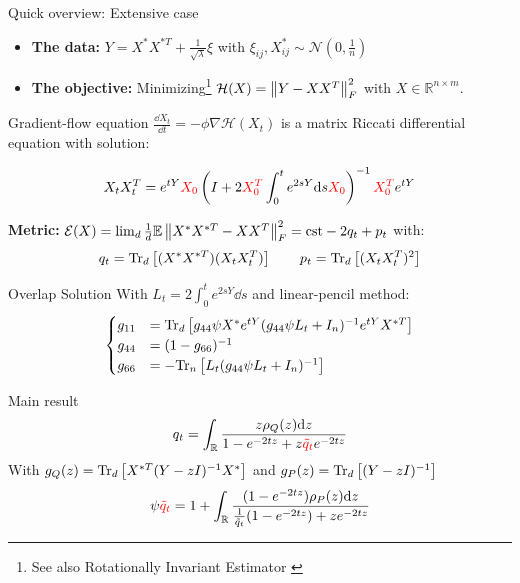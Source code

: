 \documentclass[10pt]{beamer}
\begin{document}
\begin{frame}{Quick overview: Extensive case}
  \begin{itemize}
    \item \textbf{The data:} $ Y = X^* X^{*T} + \frac{1}{\sqrt \lambda} \xi$ with $\xi_{ij},X_{ij}^*  \sim \mathcal N(0,\frac{1}{n})$ 
    \item \textbf{The objective:} Minimizing\footnote{See also Rotationally Invariant Estimator \cite{potters2020first}}
    $\mathcal H(X) = \norm{Y-XX^T}^2_F$ with $X \in \mathbb R^{n \times m}$.
  \end{itemize}

  Gradient-flow equation $\frac{\dd X_t}{\dd t} = - \phi \nabla \mathcal H(X_t)$ is a matrix Riccati differential equation with solution:

    \begin{equation*}
      X_t X_t^T = e^{tY} \textcolor{red}{X_0} \left( 
        I + 2 \textcolor{red}{X_0^T} \int_0^t e^{2sY} \dd s \textcolor{red}{X_0}
        \right)^{-1} \textcolor{red}{X_0^T} e^{tY}
    \end{equation*}

    \textbf{Metric:} $\mathcal E(X) = \lim_{d} \frac{1}{d} \mean \norm{X^* X^{*T} - XX^T}_F^2 = \text{cst} - 2 q_t + p_t$ with:
    \begin{equation*}
      q_t = \traceLim[d]{(X^*X^{*T}) (X_t X_t^T)}
      \qquad
      p_t = \traceLim[d]{(X_t X_t^T)^2}
    \end{equation*}

\end{frame}

\begin{frame}{Overlap Solution}
  With $L_t = 2\int_0^t e^{2sY}\dd s$ and linear-pencil method:
  \begin{equation*}
    \begin{cases}
      g_{11} &= \traceLim[d]{ g_{44} \psi X^* e^{tY} ( g_{44} \psi L_t + I_n)^{-1} e^{tY} X^{*T} } \\
      g_{44} & = (1-g_{66})^{-1} \\
      g_{66} &= -\traceLim[n]{ L_t (g_{44} \psi L_t + I_n)^{-1}  }
    \end{cases}
  \end{equation*}
  \begin{block}{Main result \cite{bodin10161669}}
    \begin{equation*}
        q_t = \int_{\mathbb R} 
        \frac{z \rho_Q(z) \dd z}{
            1 - e^{-2tz} + z \textcolor{red}{\tilde q_t} e^{-2tz}
        }
    \end{equation*}
    With $g_Q(z) = \traceLim[d]{X^{*T} (Y-zI)^{-1} X^*}$ and $g_P(z) = \traceLim[d]{(Y-zI)^{-1}}$
    \begin{equation*}
        \psi \textcolor{red}{\tilde q_t} = 1 + \int_{\mathbb R}  \frac{
            (1- e^{-2tz}) \rho_P(z) \dd z
        }{
            \frac{1}{\tilde q_t} (1 - e^{-2tz}) + z e^{-2tz}
        }
    \end{equation*}
  \end{block}

\end{frame}
\end{document}
